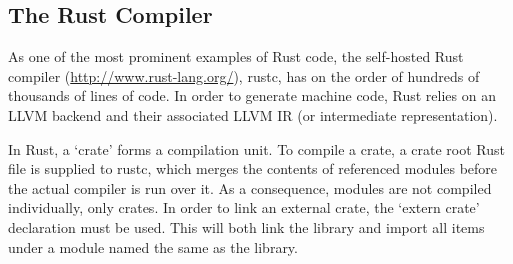 

\subsection{The Rust Compiler}

As one of the most prominent examples of Rust code, the self-hosted Rust compiler (\url{http://www.rust-lang.org/}), rustc, has on the order of hundreds of thousands of lines of code. In order to generate machine code, Rust relies on an LLVM backend and their associated LLVM IR (or intermediate representation).

In Rust, a `crate' forms a compilation unit. To compile a crate, a crate root Rust file is supplied to rustc, which merges the contents of referenced modules before the actual compiler is run over it. As a consequence, modules are not compiled individually, only crates. In order to link an external crate, the `extern crate' declaration must be used. This will both link the library and import all items under a module named the same as the library. 

